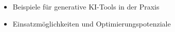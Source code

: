 \begin{itemize}
    \item Beispiele für generative KI-Tools in der Praxis
    \item Einsatzmöglichkeiten und Optimierungspotenziale
\end{itemize}